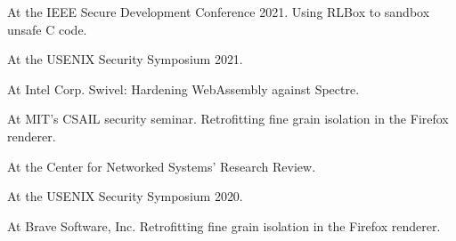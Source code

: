 { At the IEEE Secure Development Conference 2021. Using RLBox to sandbox unsafe C
code. }

{ At the USENIX Security Symposium 2021.
}

{ At Intel Corp. Swivel: Hardening WebAssembly against Spectre. }

{ At MIT's CSAIL security seminar. Retrofitting fine grain isolation in the
Firefox renderer. }

{ At the Center for Networked Systems' Research Review.
}

{ At the USENIX Security Symposium 2020.
}

{ At Brave Software, Inc. Retrofitting fine grain isolation in the Firefox
renderer. }
